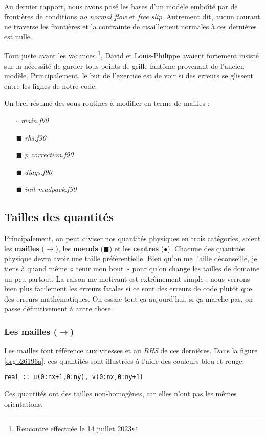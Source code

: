 \documentclass[10pt]{article}
\numberwithin{equation}{section}
\renewcommand{\boxtimes}{\blacksquare}
\begin{document}
Au \href{rapport-2023-07-07.org}{dernier rapport}, nous avons posé les bases d'un modèle emboîté par de frontières de conditions \emph{no normal flow} et \emph{free slip}.
Autrement dit, aucun courant ne traverse les frontières et la contrainte de cisaillement normales à ces dernières est nulle. \bigskip

Tout juste avant les vacances \footnote{Rencontre effectuée le 14 juillet 2023}, David et Louis-Philippe avaient fortement insisté sur la nécessité de garder tous points de grille fantôme provenant de l'ancien modèle.
Principalement, le but de l'exercice est de voir si des erreurs se glissent entre les lignes de notre code. \bigskip

Un bref résumé des sous-routines à modifier en terme de mailles : 
\begin{itemize}
\item[{$\square$}] \emph{main.f90}
\item[{$\boxtimes$}] \emph{rhs.f90}
\item[{$\boxtimes$}] \emph{p correction.f90}
\item[{$\boxtimes$}] \emph{diags.f90}
\item[{$\boxtimes$}] \emph{init mudpack.f90}
\end{itemize}


\subsection{Tailles des quantités}
\label{sec:org90ae6c0}
Principalement, on peut diviser nos quantités physiques en trois catégories, soient les \textbf{mailles} (\(\rightarrow\)), les \textbf{noeuds} (\(\blacksquare\)) et les \textbf{centres} (\(\bullet\)).
Chacune des quantités physique devra avoir une taille préférentielle.
Bien qu'on me l'aille déconseillé, je tiens à quand même « tenir mon bout » pour qu'on change les tailles de domaine un peu partout.
La raison me motivant est extrêmement simple : nous verrons bien plus facilement les erreurs fatales si ce sont des erreurs de code plutôt que des erreurs mathématiques.
On essaie tout ça aujourd'hui, si ça marche pas, on passe définitivement à autre chose.

\subsubsection{Les mailles (\(\rightarrow\))}
\label{sec:org777fa0a}
Les mailles font référence aux vitesses et au \emph{RHS} de ces dernières. 
Dans la figure \ref{orgb26196a}, ces quantités sont illustrées à l'aide des couleurs bleu et rouge.
\begin{verbatim}
real :: u(0:nx+1,0:ny), v(0:nx,0:ny+1)
\end{verbatim}
Ces quantités ont des tailles non-homogènes, car elles n'ont pas les mêmes orientations.
\end{document}
